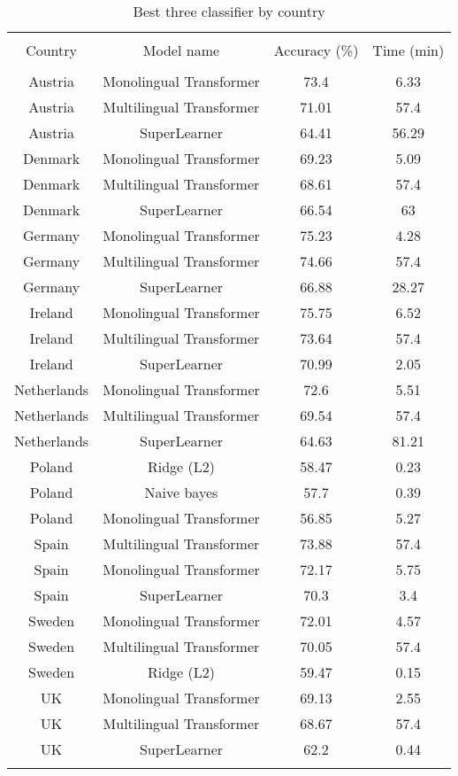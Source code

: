 
\begin{table}[!htbp] \centering 
  \caption{Best three classifier by country} 
  \label{tab:tm-eval-country} 
\begin{tabular}{@{\extracolsep{5pt}} cccc} 
\\[-1.8ex]\hline 
\hline \\[-1.8ex] 
Country & Model name & Accuracy (\%) & Time (min) \\ 
\hline \\[-1.8ex] 
Austria & Monolingual Transformer & 73.4 & 6.33 \\ 
Austria & Multilingual Transformer & 71.01 & 57.4 \\ 
Austria & SuperLearner & 64.41 & 56.29 \\ 
Denmark & Monolingual Transformer & 69.23 & 5.09 \\ 
Denmark & Multilingual Transformer & 68.61 & 57.4 \\ 
Denmark & SuperLearner & 66.54 & 63 \\ 
Germany & Monolingual Transformer & 75.23 & 4.28 \\ 
Germany & Multilingual Transformer & 74.66 & 57.4 \\ 
Germany & SuperLearner & 66.88 & 28.27 \\ 
Ireland & Monolingual Transformer & 75.75 & 6.52 \\ 
Ireland & Multilingual Transformer & 73.64 & 57.4 \\ 
Ireland & SuperLearner & 70.99 & 2.05 \\ 
Netherlands & Monolingual Transformer & 72.6 & 5.51 \\ 
Netherlands & Multilingual Transformer & 69.54 & 57.4 \\ 
Netherlands & SuperLearner & 64.63 & 81.21 \\ 
Poland & Ridge (L2) & 58.47 & 0.23 \\ 
Poland & Naive bayes & 57.7 & 0.39 \\ 
Poland & Monolingual Transformer & 56.85 & 5.27 \\ 
Spain & Multilingual Transformer & 73.88 & 57.4 \\ 
Spain & Monolingual Transformer & 72.17 & 5.75 \\ 
Spain & SuperLearner & 70.3 & 3.4 \\ 
Sweden & Monolingual Transformer & 72.01 & 4.57 \\ 
Sweden & Multilingual Transformer & 70.05 & 57.4 \\ 
Sweden & Ridge (L2) & 59.47 & 0.15 \\ 
UK & Monolingual Transformer & 69.13 & 2.55 \\ 
UK & Multilingual Transformer & 68.67 & 57.4 \\ 
UK & SuperLearner & 62.2 & 0.44 \\ 
\hline \\[-1.8ex] 
\end{tabular} 
\end{table} 
